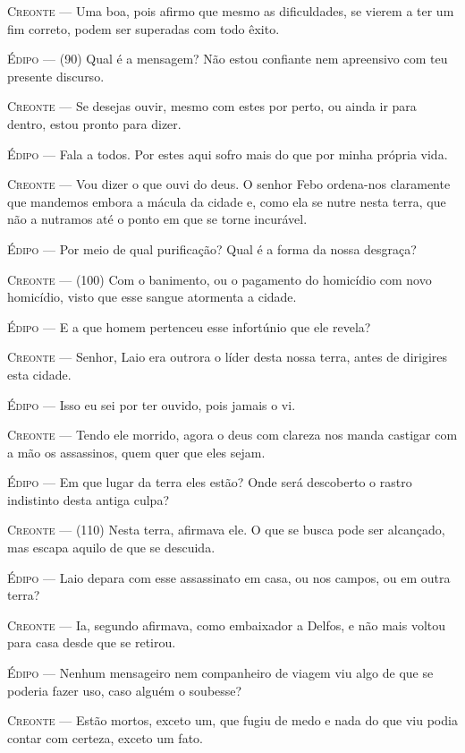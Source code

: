 \textsc{Creonte} --- Uma boa, pois afirmo que mesmo as dificuldades, se vierem a ter um fim
correto, podem ser superadas com todo êxito.

\textsc{Édipo} --- (90) Qual é a mensagem? Não estou confiante nem apreensivo com teu
presente discurso.

\textsc{Creonte} --- Se desejas ouvir, mesmo com estes por perto, ou ainda ir para dentro,
estou pronto para dizer.

\textsc{Édipo} --- Fala a todos. Por estes aqui sofro mais do que por minha própria vida.

\textsc{Creonte} --- Vou dizer o que ouvi do deus. O senhor Febo ordena-nos claramente que
mandemos embora a mácula da cidade e, como ela se nutre nesta terra, que
não a nutramos até o ponto em que se torne incurável.

\textsc{Édipo} --- Por meio de qual purificação? Qual é a forma da nossa desgraça?

\textsc{Creonte} --- (100) Com o banimento, ou o pagamento do homicídio com novo homicídio,
visto que esse sangue atormenta a cidade.

\textsc{Édipo} --- E a que homem pertenceu esse infortúnio que ele revela?

\textsc{Creonte} --- Senhor, Laio era outrora o líder desta nossa terra, antes de dirigires
esta cidade.

\textsc{Édipo} --- Isso eu sei por ter ouvido, pois jamais o vi.

\textsc{Creonte} --- Tendo ele morrido, agora o deus com clareza nos manda castigar com a mão
os assassinos, quem quer que eles sejam.

\textsc{Édipo} --- Em que lugar da terra eles estão? Onde será descoberto o rastro
indistinto desta antiga culpa?

\textsc{Creonte} --- (110) Nesta terra, afirmava ele. O que se busca pode ser alcançado, mas
escapa aquilo de que se descuida.

\textsc{Édipo} --- Laio depara com esse assassinato em casa, ou nos campos, ou em outra
terra?

\textsc{Creonte} --- Ia, segundo afirmava, como embaixador a Delfos, e não mais voltou para
casa desde que se retirou.

\textsc{Édipo} --- Nenhum mensageiro nem companheiro de viagem viu algo de que se poderia
fazer uso, caso alguém o soubesse?

\textsc{Creonte} --- Estão mortos, exceto um, que fugiu de medo e nada do que viu podia
contar com certeza, exceto um fato.

